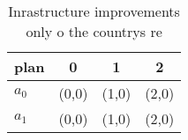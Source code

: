 \documentclass[a4paper]{article}
\begin{document}
\begin{table}
\begin{adjustbox}{width=0.6\columnwidth}
\begin{tabular}{|l|l|l|l|}
\hline
\textbf{plan} & \multicolumn{1}{c|}{\textbf{0}} & \multicolumn{1}{c|}{\textbf{1}} & \multicolumn{1}{c|}{\textbf{2}} \\ \hline
\textbf{$a_0$}  & (0,0) & (1,0) & (2,0) \\ \hline
\textbf{$a_1$}  & (0,0) & (1,0) & (2,0) \\ \hline
\end{tabular}
\end{adjustbox}
\caption{Inrastructure improvements only o the countrys re
}
\end{table}
\end{document}
